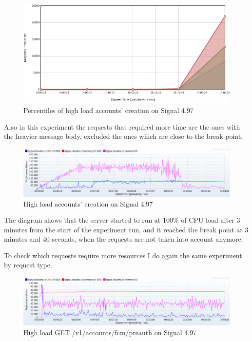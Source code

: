\begin{figure}[H]
    \centering
    \includegraphics[width=\textwidth]{images/497/highloadregisteroldpct}
    \caption{Percentiles of high load accounts' creation on Signal 4.97}
    \label{fig:signalbasecreateloadoldpct}
\end{figure}

Also in this experiment the requests that required more time are the ones with the heavier message body, excluded the ones which are close to the break point.

\begin{figure}[H]
    \centering
    \includegraphics[width=\textwidth]{images/497/signal-create-load}
    \caption{High load accounts' creation on Signal 4.97}
    \label{fig:signalcreateloadold}
\end{figure}

The diagram shows that the server started to run at $100$\% of CPU load after $3$ minutes from the start of the experiment run, and it reached the break point at $3$ minutes and $40$ seconds, when the requests are not taken into account anymore.

To check which requests require more resources I do again the same experiment by request type.

\begin{figure}[H]
    \centering
    \includegraphics[width=\textwidth]{images/497/create-load-1}
    \caption{High load GET /v1/accounts/fcm/preauth on Signal 4.97}
    \label{fig:signalload1old}
\end{figure}


